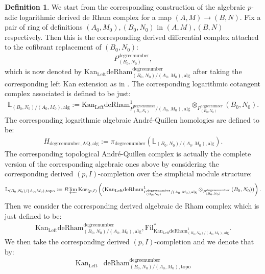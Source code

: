 \documentclass[11pt]{book}
\theoremstyle{definition}
\newtheorem{definition}[theorem]{Definition}
\numberwithin{equation}{section}
\begin{document}
\begin{definition}
We start from the corresponding construction of the algebraic $p$-adic logarithmic derived de Rham complex for a map $(A,M)\rightarrow (B,N)$. Fix a pair of ring of definitions $(A_0,M_0),(B_0,N_0)$ in $(A,M),(B,N)$ respectively. Then this is the corresponding derived differential complex attached to the cofibrant replacement of $(B_0,N_0)$:
\begin{align}
P^\text{degreenumber}_{(B_0,N_0)},	
\end{align}
which is now denoted by $\mathrm{Kan}_\mathrm{Left}\mathrm{deRham}^\text{degreenumber}_{(B_0,N_0)/(A_0,M_0),\mathrm{alg}}$ after taking the corresponding left Kan extension as in \cite[Chapter 6]{12B1}. The corresponding logarithmic cotangent complex associated is defined to be just:
\begin{align}
\mathbb{L}_{(B_0,N_0)/(A_0,M_0),\mathrm{alg}}:=	\mathrm{Kan}_\mathrm{Left}\mathrm{deRham}^1_{P^\text{degreenumber}_{(B_0,N_0)}/(A_0,M_0),\mathrm{alg}}\otimes_{P^\text{degreenumber}_{(B_0,N_0)}} (B_0,N_0).
\end{align}
The corresponding logarithmic algebraic Andr\'e-Quillen homologies are defined to be:
\begin{align}
H_{\text{degreenumber},{\mathrm{AQ}},\mathrm{alg}}:=\pi_\text{degreenumber} (\mathbb{L}_{(B_0,N_0)/(A_0,M_0),\mathrm{alg}}). 	
\end{align}
The corresponding topological Andr\'e-Quillen complex is actually the complete version of the corresponding algebraic ones above by considering the corresponding derived $(p,I)$-completion over the simplicial module structure:
\begin{align}
\mathbb{L}_{(B_0,N_0)/(A_0,M_0),\mathrm{topo}}:=R\varprojlim \mathrm{Kos}_{(p,I)}	\left((\mathrm{Kan}_\mathrm{Left}\mathrm{deRham}^1_{P^\text{degreenumber}_{(B_0,N_0)}/(A_0,M_0),\mathrm{alg}}\otimes_{P^\text{degreenumber}_{(B_0,N_0)}} (B_0,N_0))\right).
\end{align}
Then we consider the corresponding derived algebraic de Rham complex which is just defined to be:
\begin{align}
\mathrm{Kan}_\mathrm{Left}\mathrm{deRham}^\text{degreenumber}_{(B_0,N_0)/(A_0,M_0),\mathrm{alg}},\mathrm{Fil}^*_{\mathrm{Kan}_\mathrm{Left}\mathrm{deRham}^1_{(B_0,N_0)/(A_0,M_0),\mathrm{alg}}}.	
\end{align}
We then take the corresponding derived $(p,I)$-completion and we denote that by:
\begin{align}
\mathrm{Kan}_\mathrm{Left}&\mathrm{deRham}^\text{degreenumber}_{(B_0,N_0)/(A_0,M_0),\mathrm{topo}}\\

\end{align}
\end{definition}
\end{document}
